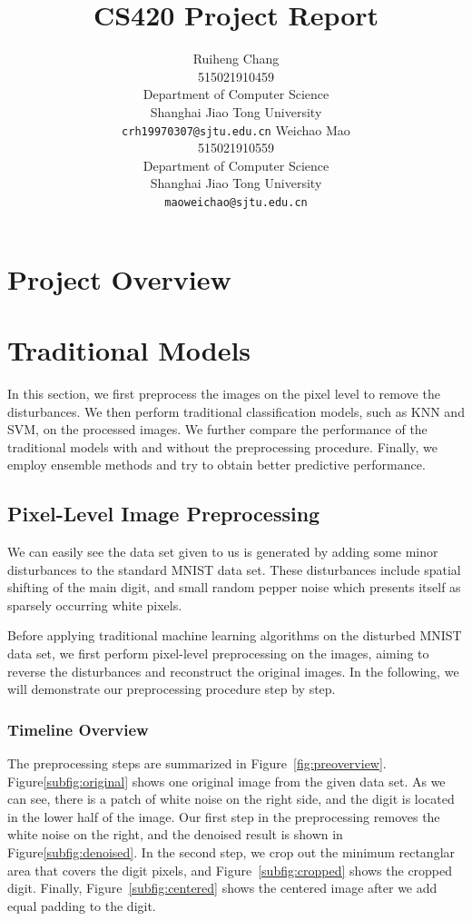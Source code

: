\documentclass{article}
\title{CS420 Project Report}
\author{
  Ruiheng Chang \\
  515021910459\\
  Department of Computer Science\\
  Shanghai Jiao Tong University\\
  \texttt{crh19970307@sjtu.edu.cn}
  \And
  Weichao Mao \\
  515021910559\\
  Department of Computer Science\\
  Shanghai Jiao Tong University\\
  \texttt{maoweichao@sjtu.edu.cn}
}
\begin{document}

\maketitle

\section{Project Overview}


\section{Traditional Models}
In this section, we first preprocess the images on the pixel level to remove the disturbances. We then perform traditional classification models, such as KNN and SVM, on the processed images. We further compare the performance of the traditional models with and without the preprocessing procedure. Finally, we employ ensemble methods and try to obtain better predictive performance.

\subsection{Pixel-Level Image Preprocessing}
We can easily see the data set given to us is generated by adding some minor disturbances to the standard MNIST data set. These disturbances include spatial shifting of the main digit, and small random pepper noise which presents itself as sparsely occurring white pixels. 

Before applying traditional machine learning algorithms on the disturbed MNIST data set, we first perform pixel-level preprocessing on the images, aiming to reverse the disturbances and reconstruct the original images. In the following, we will demonstrate our preprocessing procedure step by step.

\subsubsection{Timeline Overview}
The preprocessing steps are summarized in Figure~\ref{fig:preoverview}. Figure\ref{subfig:original} shows one original image from the given data set. As we can see, there is a patch of white noise on the right side, and the digit is located in the lower half of the image. Our first step in the preprocessing removes the white noise on the right, and the denoised result is shown in Figure\ref{subfig:denoised}. In the second step, we crop out the minimum rectanglar area that covers the digit pixels, and Figure~\ref{subfig:cropped} shows the cropped digit. Finally, Figure~\ref{subfig:centered} shows the centered image after we add equal padding to the digit. 
\end{document}
